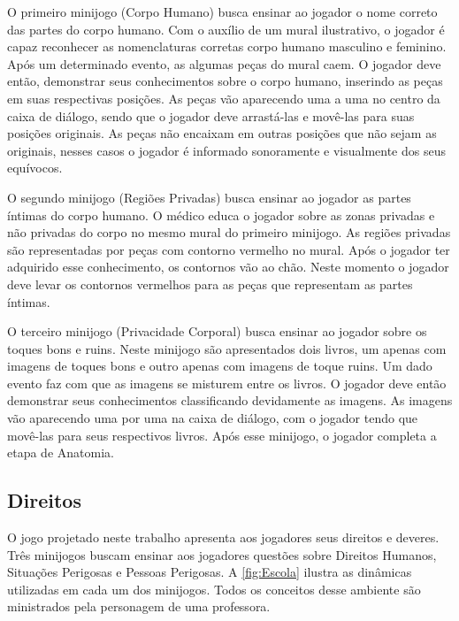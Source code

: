O primeiro minijogo (Corpo Humano) busca ensinar ao jogador o nome correto das partes do corpo humano. Com o auxílio de um mural ilustrativo, o jogador é capaz reconhecer as nomenclaturas corretas corpo humano masculino e feminino. Após um determinado evento, as  algumas peças do mural caem. O jogador deve então, demonstrar seus conhecimentos sobre o corpo humano, inserindo as peças em suas respectivas posições. As peças vão aparecendo uma a uma no centro da caixa de diálogo, sendo que o jogador deve arrastá-las e movê-las para suas posições originais. As peças não encaixam em outras posições que não sejam as originais, nesses casos o jogador é informado sonoramente e visualmente dos seus equívocos. 


O segundo minijogo (Regiões Privadas) busca ensinar ao jogador as partes íntimas do corpo humano. O médico educa o jogador sobre as zonas privadas e não privadas do corpo no mesmo mural do primeiro minijogo. As regiões privadas são representadas por peças com contorno vermelho no mural. Após o jogador ter adquirido esse conhecimento, os contornos vão ao chão. Neste momento o jogador deve levar os contornos vermelhos para as peças que representam as partes íntimas.

O terceiro minijogo (Privacidade Corporal) busca ensinar ao jogador sobre os toques bons e ruins. Neste minijogo são apresentados dois livros, um apenas com imagens de toques bons e outro apenas com imagens de toque ruins. Um dado evento faz com que as imagens se misturem entre os livros. O jogador deve então demonstrar seus conhecimentos classificando devidamente as imagens. As imagens vão aparecendo uma por uma na caixa de diálogo, com o jogador tendo que movê-las para seus respectivos livros. Após esse minijogo, o jogador completa a etapa de Anatomia.%

\subsection{Direitos}\label{subsec:2}

O jogo projetado neste trabalho apresenta aos jogadores seus direitos e deveres. Três minijogos buscam ensinar aos jogadores questões sobre Direitos Humanos, Situações Perigosas e Pessoas Perigosas. A \autoref{fig:Escola} ilustra as dinâmicas utilizadas em cada um dos minijogos. Todos os conceitos desse ambiente são ministrados pela personagem de uma professora. 

